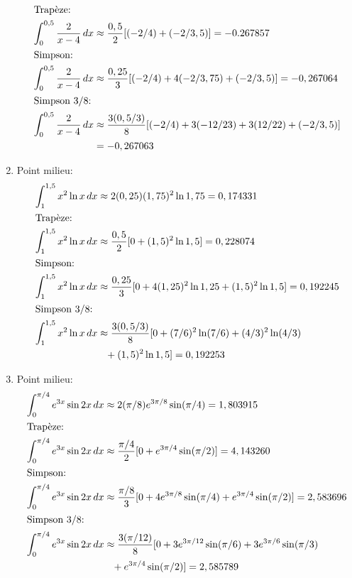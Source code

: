 \begin{exercice}
\begin{sol}
\begin{enumerate}
\begin{align*}
        \intertext{Trapèze:}
        \int_0^{0,5} \frac{2}{x - 4}\, dx &\approx
        \frac{0,5}{2} [(-2/4) + (-2/3,5)] = -0.267857 \\
        \intertext{Simpson:}
        \int_0^{0,5} \frac{2}{x - 4}\, dx &\approx
        \frac{0,25}{3} [(-2/4) + 4(-2/3,75) + (-2/3,5)] = -0,267064 \\
        \intertext{Simpson 3/8:}
        \int_0^{0,5} \frac{2}{x - 4}\, dx &\approx
        \frac{3(0,5/3)}{8} [(-2/4) + 3(-12/23) + 3(12/22) + (-2/3,5)]
        \\
        &= -0,267063
      \end{align*}
    \item Point milieu:
      \begin{align*}
        \int_1^{1,5} x^2 \ln x\, dx &\approx
        2(0,25) (1,75)^2 \ln 1,75 = 0,174331 \\
        \intertext{Trapèze:}
        \int_1^{1,5} x^2 \ln x\, dx &\approx
        \frac{0,5}{2} [0 + (1,5)^2 \ln 1,5] = 0,228074 \\
        \intertext{Simpson:}
        \int_1^{1,5} x^2 \ln x\, dx &\approx
        \frac{0,25}{3} [0 + 4 (1,25)^2 \ln 1,25 + (1,5)^2 \ln 1,5] = 0,192245 \\
        \intertext{Simpson 3/8:}
        \int_1^{1,5} x^2 \ln x\, dx &\approx
        \frac{3(0,5/3)}{8} [0 + (7/6)^2 \ln (7/6) + (4/3)^2 \ln (4/3) \\
        &\phantom{\approx} + (1,5)^2 \ln 1,5] = 0,192253
      \end{align*}
    \item Point milieu:
      \begin{align*}
        \int_0^{\pi/4} e^{3x} \sin 2x\, dx &\approx
        2(\pi/8) e^{3\pi/8} \sin (\pi/4) = 1,803915 \\
        \intertext{Trapèze:}
        \int_0^{\pi/4} e^{3x} \sin 2x\, dx &\approx
        \frac{\pi/4}{2} [0 + e^{3\pi/4} \sin (\pi/2)] = 4,143260 \\
        \intertext{Simpson:}
        \int_0^{\pi/4} e^{3x} \sin 2x\, dx &\approx
        \frac{\pi/8}{3} [0 + 4 e^{3\pi/8} \sin (\pi/4) + e^{3\pi/4} \sin (\pi/2)] = 2,583696 \\
        \intertext{Simpson 3/8:}
        \int_0^{\pi/4} e^{3x} \sin 2x\, dx &\approx
        \frac{3(\pi/12)}{8} [0 + 3 e^{3\pi/12} \sin (\pi/6) + 3
        e^{3\pi/6} \sin (\pi/3) \\
        &\phantom{\approx} + e^{3\pi/4} \sin (\pi/2)] = 2,585789
      \end{align*}
    \end{enumerate}
  \end{sol}
\end{exercice}

